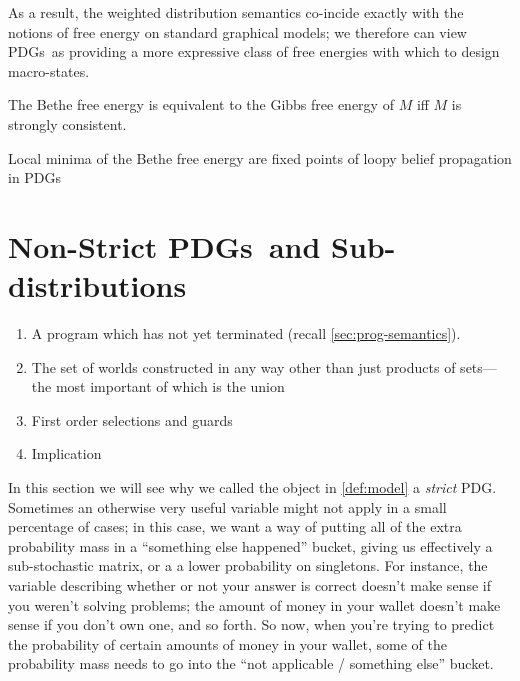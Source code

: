 \documentclass{article}
\newcommand\changeon{\color{note-fg} }
\newcommand\changeoff{\color{black} }
\newcommand{\MN}{PDG}
\newcommand{\MNs}{\MN s}
\begin{document}
	As a result, the weighted distribution semantics co-incide exactly with the notions of free energy on standard graphical models; we therefore can view \MNs\ as providing a more expressive class of free energies with which to design macro-states.
	
	\begin{conj}
		The Bethe free energy is equivalent to the Gibbs free energy of $M$ iff $M$ is strongly consistent.
	\end{conj}
	\begin{coro}
		Local minima of the Bethe free energy are fixed points of loopy belief propagation in \MNs		
	\end{coro}

	\changeoff

		

	\section{Non-Strict \MNs\ and Sub-distributions} \label{sec:full-model}
	
	\changeon
	\begin{enumerate}
		\item A program which has not yet terminated (recall \cref{sec:prog-semantics}).
		\item The set of worlds constructed in any way other than just products of sets---the most important of which is the union
		\item First order selections and guards
		\item Implication
	\end{enumerate}
	\changeoff
	
	
	In this section we will see why we called the object in \cref{def:model} a \textit{strict} \MN.	
	Sometimes an otherwise very useful variable might not apply in a small percentage of cases; in this case, we want a way of putting all of the extra probability mass in a ``something else happened'' bucket, giving us effectively a sub-stochastic matrix, or a a lower probability on singletons. For instance, the variable describing whether or not your answer is correct doesn't make sense if you weren't solving problems; the amount of money in your wallet doesn't make sense if you don't own one, and so forth. So now, when you're trying to predict the probability of certain amounts of money in your wallet, some of the probability mass needs to go into the ``not applicable / something else'' bucket. 
	
\end{document}
